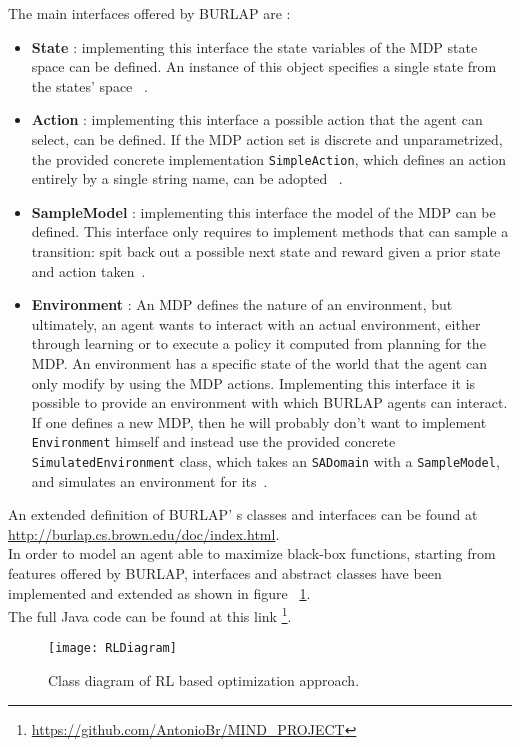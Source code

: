 The main interfaces offered by BURLAP are :
	
\begin{itemize}
	\item \textbf{State} : implementing this interface the state variables of the MDP state space can be defined. An instance of this object specifies a single state from the states' space~\cite{BURLAPSite} .
	\item \textbf{Action} : implementing this interface a possible action that the agent can select, can be defined. If the MDP action set is discrete and unparametrized, the provided concrete implementation {\tt SimpleAction}, which defines an action entirely by a single string name, can be adopted ~\cite{BURLAPSite}.
	\item \textbf{SampleModel} : implementing this interface the model of the MDP can be defined. This interface only requires to implement methods that can sample a transition: spit back out a possible next state and reward given a prior state and action taken~\cite{BURLAPSite}.
	\item  \textbf{Environment} : An MDP defines the nature of an environment, but ultimately, an agent wants to interact with an actual environment, either through learning or to execute a policy it computed from planning for the MDP. An environment has a specific state of the world that the agent can only modify by using the MDP actions. Implementing this interface it is possible to provide an environment with which BURLAP agents can interact. If one defines a new MDP, then he will probably don't want to implement {\tt Environment} himself and instead use the provided concrete {\tt SimulatedEnvironment} class, which takes an {\tt SADomain} with a {\tt SampleModel}, and simulates an environment for its~\cite{BURLAPSite}.
\end{itemize}

An extended definition of BURLAP' s classes and interfaces can be found at \url{http://burlap.cs.brown.edu/doc/index.html}. \\

In order to model an agent able to maximize black-box functions, starting from features offered by BURLAP, interfaces and abstract classes have been implemented and extended as shown in figure ~\ref{fig:RLUMLDiagram}. \\

The full Java code can be found at this link \footnote{\url{https://github.com/AntonioBr/MIND_PROJECT}}.

\begin{figure} [h!]
	\texttt{[image: RLDiagram]}
	\caption{Class diagram of RL based optimization approach.}
	\label{fig:RLUMLDiagram}
\end{figure}

